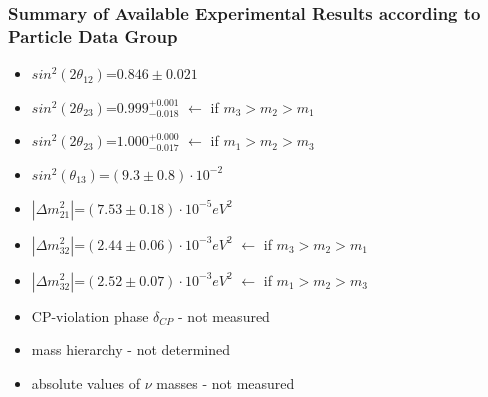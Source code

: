 \begin{frame}\frametitle{Summary of Available Experimental Results according to Particle Data Group \cite{ref_PDG}}
  \scriptsize
  \begin{itemize}
    \item $sin^2(2\theta_{12})$=$0.846\pm0.021$
    \item $sin^2(2\theta_{23})$=$0.999^{+0.001}_{-0.018}$ $\leftarrow$ if $m_3>m_2>m_1$
    \item $sin^2(2\theta_{23})$=$1.000^{+0.000}_{-0.017}$ $\leftarrow$ if $m_1>m_2>m_3$
    \item $sin^2(\theta_{13})$=$(9.3\pm0.8)\cdot10^{-2}$
    \item $|{\Delta}m^2_{21}|$=$(7.53\pm0.18) \cdot 10^{-5} eV^2$
    \item $|{\Delta}m^2_{32}|$=$(2.44\pm0.06) \cdot 10^{-3} eV^2$ $\leftarrow$ if $m_3>m_2>m_1$
    \item $|{\Delta}m^2_{32}|$=$(2.52\pm0.07) \cdot 10^{-3} eV^2$ $\leftarrow$ if $m_1>m_2>m_3$
    \item CP-violation phase $\delta_{CP}$ - {\large not measured}
    \item mass hierarchy - {\large not determined}
    \item absolute values of $\nu$ masses - {\large not measured}
  \end{itemize}
\end{frame}

